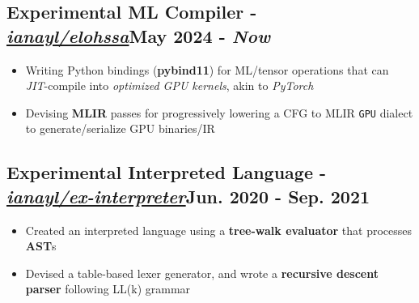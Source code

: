 \documentclass[9pt]{article}
\begin{document}
\subsection{Experimental ML Compiler \normalsize\textnormal{- \href{https://github.com/ianayl/elohssa}{\textit{ianayl/elohssa}}}\hfill \normalsize\textnormal{May 2024 - \textit{Now}}}
\begin{itemize}
  \item Writing Python bindings (\textbf{pybind11}) for ML/tensor operations that can \textit{JIT}-compile into \textit{optimized GPU kernels}, akin to \textit{PyTorch}
  \item Devising \textbf{MLIR} passes for progressively lowering a CFG to MLIR \texttt{GPU} dialect to generate/serialize GPU binaries/IR
\end{itemize}
\vspace{-1em}

\subsection{Experimental Interpreted Language \normalsize\textnormal{- \href{https://github.com/ianayl/ex-interpreter}{\textit{ianayl/ex-interpreter}}}\hfill \normalsize\textnormal{Jun. 2020 - Sep. 2021}}
\begin{itemize}
  \item Created an interpreted language using a \textbf{tree-walk evaluator} that processes \textbf{AST}s
  \item Devised a table-based lexer generator, and wrote a \textbf{recursive descent parser} following LL(k) grammar
\end{itemize}
\vspace{-1em}
\end{document}
